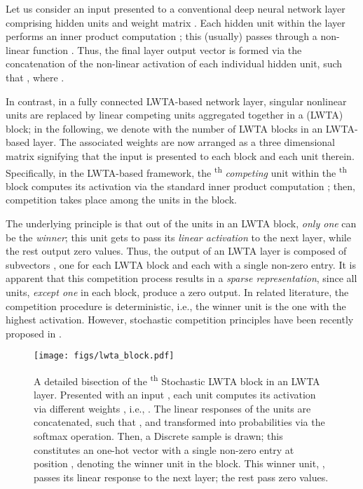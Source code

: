 \documentclass{article}
\begin{document}
	
	Let us consider an input  presented to a conventional deep neural network layer comprising  hidden units and weight matrix . Each hidden unit  within the layer performs an inner product computation ; this (usually) passes through a  non-linear function . Thus, the final layer output vector  is formed via the concatenation of the non-linear activation of each individual hidden unit, such that  , where . 
	
	In contrast, in a fully connected LWTA-based network layer, singular nonlinear units are replaced by  linear competing units aggregated together in a (LWTA) block; in the following, we denote with  the number of LWTA blocks in an LWTA-based layer. The associated weights are now arranged as a three dimensional matrix  signifying that the input  is presented to each block and each unit therein. Specifically, in the LWTA-based framework, the \textsuperscript{th} \textit{competing} unit within the \textsuperscript{th} block computes its activation  via the standard inner product computation ; then, competition takes place among the units in the block. 
	
	The underlying principle is that out of the  units in an LWTA block, \textit{only one} can be the \textit{winner}; this unit gets to pass its \textit{linear activation} to the next layer, while the rest output zero values. Thus, the output of an LWTA layer  is composed of  subvectors , one for each LWTA block and each with a single non-zero entry. It is apparent that this competition process results in a \textit{sparse representation}, since all units, \textit{except one} in each block, produce a zero output. In related literature, the competition procedure is deterministic, i.e., the winner unit is the one with the highest activation. However, stochastic competition principles have been recently proposed in \cite{panousis2019nonparametric,panousis21a, Voskou_2021_ICCV}.
\begin{figure}
		\centering
		\texttt{[image: figs/lwta\_block.pdf]}
		\caption{A detailed bisection of the \textsuperscript{th} Stochastic LWTA block in an LWTA layer. Presented with an input ,  each unit  computes its activation  via different weights , i.e., . The linear responses of the units are concatenated, such that  , and transformed into probabilities via the softmax operation. Then, a Discrete sample  is drawn; this constitutes an one-hot vector with a single non-zero entry at position , denoting the winner unit in the block. This winner unit, , passes its linear response to the next layer; the rest pass zero values.
		}
		\label{fig:block}
	\end{figure}
\end{document}
